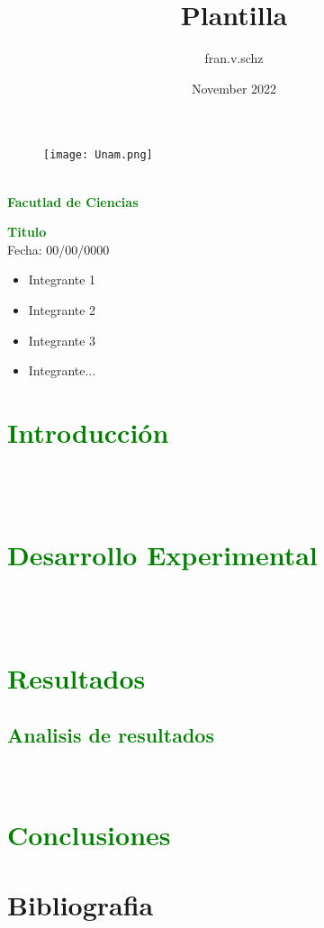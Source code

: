 \documentclass{article}
\title{Plantilla}
\author{fran.v.schz }
\date{November 2022}
\begin{document}
\begin{figure}[h]
    \centering
    \texttt{[image: Unam.png]}
\end{figure}

{\centering 
{{\textls{\huge{\textbf{\textcolor{Green}{Universidad Nacional Autonoma de México}}}}}}\\
\vspace{1cm}
{\Huge{\textbf{\textcolor{Green}{Facutlad de Ciencias}}}}\\
\vspace{1cm}
\hline
\vspace{2cm} 

{\centering
{\Huge{\textbf{\textcolor{Green}{Titulo}}}}\\
\vspace{1cm}
\Large{Fecha: 00/00/0000}}


\vspace{2cm}

\Large{
\begin{itemize}
    \item Integrante 1 
    \item Integrante 2 
    \item Integrante 3 
    \item Integrante...
\end{itemize}}
}



\newpage

\begin{abstract}
    \lipsum[1-2]
\end{abstract}
\section{\textcolor{Green}{Introducción}}


\lipsum[22]\\
\lipsum[10]\\
\section{\textcolor{Green}{Desarrollo Experimental}}


\lipsum[43]\\
\lipsum[33]\\


\section{\textcolor{Green}{Resultados}}
\lipsum[54]


\subsection{\textcolor{Green}{Analisis de resultados}}
\lipsum[52]\\
\lipsum[45]


\section{\textcolor{Green}{Conclusiones}}
\lipsum[1-2]


\section*{Bibliografia}
\lipsum[16]
\end{document}
